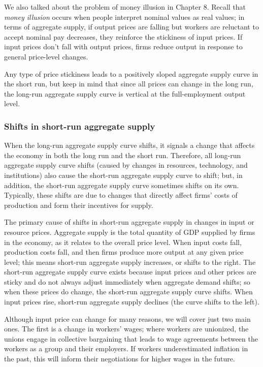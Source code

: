 \documentclass[11pt]{article} %
\begin{document}
We also talked about the problem of money illusion in Chapter 8. Recall that \textit{money illusion} occurs when people interpret nominal values as real values; in terms of aggregate supply, if output prices are falling but workers are reluctant to accept nominal pay decreases, they reinforce the stickiness of input prices. If input prices don't fall with output prices, firms reduce output in response to general price-level changes.

Any type of price stickiness leads to a positively sloped aggregate supply curve in the short run, but keep in mind that since all prices can change in the long run, the long-run aggregate supply curve is vertical at the full-employment output level.

\subsubsection*{Shifts in short-run aggregate supply}
When the long-run aggregate supply curve shifts, it signals a change that affects the economy in both the long run and the short run. Therefore, all long-run aggregate supply curve shifts (caused by changes in resources, technology, and institutions) also cause the short-run aggregate supply curve to shift; but, in addition, the short-run aggregate supply curve sometimes shifts on its own. Typically, these shifts are due to changes that directly affect firms' costs of production and form their incentives for supply.

The primary cause of shifts in short-run aggregate supply in changes in input or resource prices. Aggregate supply is the total quantity of GDP supplied by firms in the economy, as it relates to the overall price level. When input costs fall, production costs fall, and then firms produce more output at any given price level; this means short-run aggregate supply increases, or shifts to the right. The short-run aggregate supply curve exists because input prices and other prices are sticky and do not always adjust immediately when aggregate demand shifts; so when these prices do change, the short-run aggregate supply curve shifts. When input prices rise, short-run aggregate supply declines (the curve shifts to the left).

Although input price can change for many reasons, we will cover just two main ones. The first is a change in workers' wages; where workers are unionized, the unions engage in collective bargaining that leads to wage agreements between the workers as a group and their employers. If workers underestimated inflation in the past, this will inform their negotiations for higher wages in the future.
\end{document}
